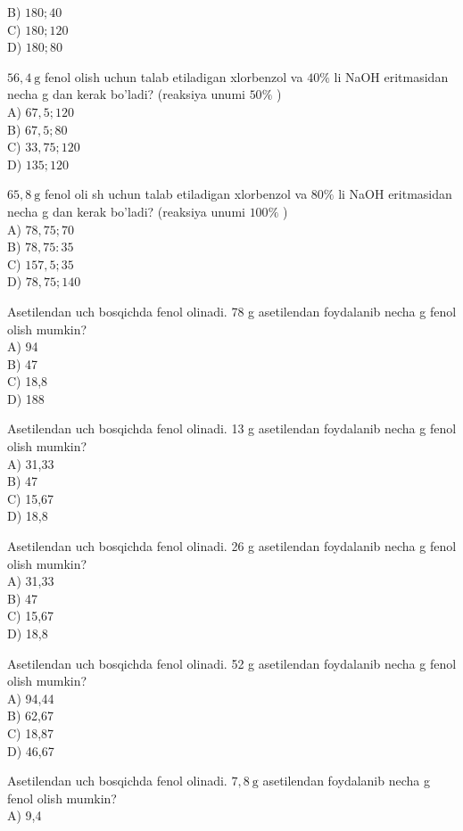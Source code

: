 B) $180 ; 40$\\
C) $180 ; 120$\\
D) $180 ; 80$
  \item $56,4 \mathrm{~g}$ fenol olish uchun talab etiladigan xlorbenzol va $40 \%$ li NaOH eritmasidan necha g dan kerak bo'ladi? (reaksiya unumi $50 \%$ )\\
A) $67,5 ; 120$\\
B) $67,5 ; 80$\\
C) $33,75 ; 120$\\
D) $135 ; 120$
  \item $65,8 \mathrm{~g}$ fenol oli sh uchun talab etiladigan xlorbenzol va $80 \%$ li NaOH eritmasidan necha g dan kerak bo'ladi? (reaksiya unumi $100 \%$ )\\
A) $78,75 ; 70$\\
B) $78,75: 35$\\
C) $157,5 ; 35$\\
D) $78,75 ; 140$
  \item Asetilendan uch bosqichda fenol olinadi. 78 g asetilendan foydalanib necha g fenol olish mumkin?\\
A) 94\\
B) 47\\
C) 18,8\\
D) 188
  \item Asetilendan uch bosqichda fenol olinadi. 13 g asetilendan foydalanib necha g fenol olish mumkin?\\
A) 31,33\\
B) 47\\
C) 15,67\\
D) 18,8
  \item Asetilendan uch bosqichda fenol olinadi. 26 g asetilendan foydalanib necha g fenol olish mumkin?\\
A) 31,33\\
B) 47\\
C) 15,67\\
D) 18,8
  \item Asetilendan uch bosqichda fenol olinadi. 52 g asetilendan foydalanib necha g fenol olish mumkin?\\
A) 94,44\\
B) 62,67\\
C) 18,87\\
D) 46,67
  \item Asetilendan uch bosqichda fenol olinadi. $7,8 \mathrm{~g}$ asetilendan foydalanib necha g fenol olish mumkin?\\
A) 9,4\\
